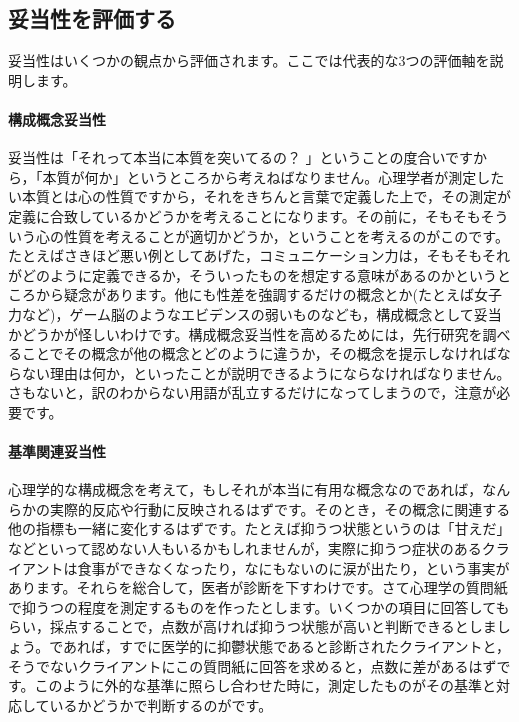 \documentclass{ltjbook}
\begin{document}
\subsection{妥当性を評価する}
妥当性はいくつかの観点から評価されます。ここでは代表的な3つの評価軸を説明します。
\paragraph{構成概念妥当性} 妥当性は「それって本当に本質を突いてるの？ 」ということの度合いですから，「本質が何か」というところから考えねばなりません。心理学者が測定したい本質とは心の性質ですから，それをきちんと言葉で定義した上で，その測定が定義に合致しているかどうかを考えることになります。その前に，そもそもそういう心の性質を考えることが適切かどうか，ということを考えるのがこのです。たとえばさきほど悪い例としてあげた，コミュニケーション力は，そもそもそれがどのように定義できるか，そういったものを想定する意味があるのかというところから疑念があります。他にも性差を強調するだけの概念とか(たとえば女子力など)，ゲーム脳のようなエビデンスの弱いものなども，構成概念として妥当かどうかが怪しいわけです。構成概念妥当性を高めるためには，先行研究を調べることでその概念が他の概念とどのように違うか，その概念を提示しなければならない理由は何か，といったことが説明できるようにならなければなりません。さもないと，訳のわからない用語が乱立するだけになってしまうので，注意が必要です。

\paragraph{基準関連妥当性}心理学的な構成概念を考えて，もしそれが本当に有用な概念なのであれば，なんらかの実際的反応や行動に反映されるはずです。そのとき，その概念に関連する他の指標も一緒に変化するはずです。たとえば抑うつ状態というのは「甘えだ」などといって認めない人もいるかもしれませんが，実際に抑うつ症状のあるクライアントは食事ができなくなったり，なにもないのに涙が出たり，という事実があります。それらを総合して，医者が診断を下すわけです。さて心理学の質問紙で抑うつの程度を測定するものを作ったとします。いくつかの項目に回答してもらい，採点することで，点数が高ければ抑うつ状態が高いと判断できるとしましょう。であれば，すでに医学的に抑鬱状態であると診断されたクライアントと，そうでないクライアントにこの質問紙に回答を求めると，点数に差があるはずです。このように外的な基準に照らし合わせた時に，測定したものがその基準と対応しているかどうかで判断するのがです。
\end{document}
